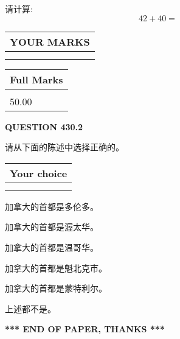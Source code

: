 \documentclass{ctexart}
\begin{document}
  
 
请计算:
\begin{equation}
42 +  %
40 = \nonumber
\end{equation}
 

 

 
  
\vspace{0.2in}
  
\noindent\begin{tabular}{|l|}
\hline
 YOUR MARKS  \\
\hline
 \\ 
 \\ 
\hline
\end{tabular}
\hspace{0.05in} \begin{tabular}{|l|}
\hline
 Full Marks  \\
\hline
 \\ 
50.00 \\
\hline
\end{tabular}
{\textbf{\Large{QUESTION
430.2 
}}}
  
  
请从下面的陈述中选择正确的。
  
  
\noindent\hspace{3.0in} \begin{tabular}{|l|}
\hline
Your choice \\
\hline
 \\ 
 \\ 
\hline
\end{tabular}
  
  
 
 
加拿大的首都是多伦多。
 
 
加拿大的首都是渥太华。
 
 
加拿大的首都是温哥华。
 
 
加拿大的首都是魁北克市。
 
 
加拿大的首都是蒙特利尔。
 
 
 上述都不是。
 
 
   
   
 \vspace{0.2in}
 
   
   
   
   
\vspace{1.0in} 
{\textbf{\large{ *** END OF PAPER, THANKS *** }}} 
   
\end{document}
